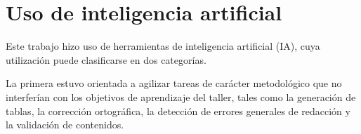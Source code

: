 \documentclass[a4paper]{article}
\begin{document}
\newpage
 
\section{Uso de inteligencia artificial}
\label{anexo:Uso_IA}

Este trabajo hizo uso de herramientas de inteligencia artificial (IA), cuya utilización puede clasificarse en dos categorías.

La primera estuvo orientada a agilizar tareas de carácter metodológico que no interferían con los objetivos de aprendizaje del taller, tales como la generación de tablas, la corrección ortográfica, la detección de errores generales de redacción y la validación de contenidos.
\end{document}
